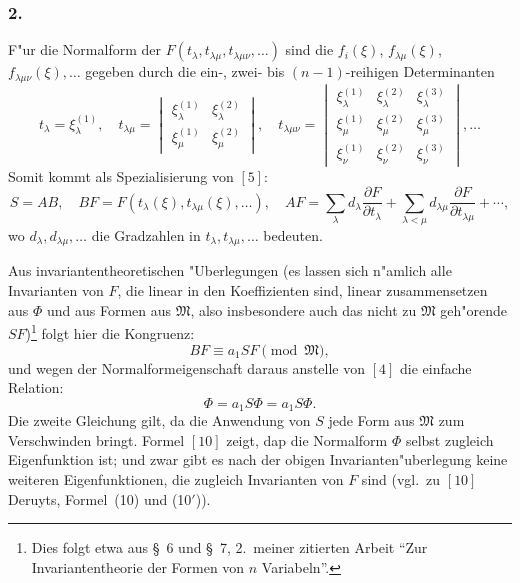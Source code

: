 \documentclass[12pt,a4paper]{article}
\begin{document}
\subsubsection*{2.}

F"ur die Normalform der $F(t_\lambda, t_{\lambda\mu}, t_{\lambda\mu\nu}, \ldots)$ sind die $f_i(\xi)$, $f_{\lambda\mu}(\xi)$, $f_{\lambda\mu\nu}(\xi),\ldots$ gegeben durch die ein-, zwei- bis $(n-1)$-reihigen Determinanten
\begin{equation}
t_\lambda = \xi_\lambda^{(1)}, \quad t_{\lambda\mu} = \begin{vmatrix} \xi_\lambda^{(1)} & \xi_\lambda^{(2)} \\ \xi_\mu^{(1)} & \xi_\mu^{(2)} \end{vmatrix}, \quad t_{\lambda\mu\nu} = \begin{vmatrix} \xi_\lambda^{(1)} & \xi_\lambda^{(2)} & \xi_\lambda^{(3)} \\ \xi_\mu^{(1)} & \xi_\mu^{(2)} & \xi_\mu^{(3)} \\ \xi_\nu^{(1)} & \xi_\nu^{(2)} & \xi_\nu^{(3)} \end{vmatrix}, \ldots
\end{equation}
Somit kommt als Spezialisierung von $[5]$:
\[
S = AB, \quad BF = F(t_\lambda(\xi), t_{\lambda\mu}(\xi), \ldots), \quad AF = \sum_\lambda d_\lambda \frac{\partial F}{\partial t_\lambda} + \sum_{\lambda<\mu} d_{\lambda\mu} \frac{\partial F}{\partial t_{\lambda\mu}} + \cdots,
\]
wo $d_\lambda, d_{\lambda\mu}, \ldots$ die Gradzahlen in $t_\lambda, t_{\lambda\mu}, \ldots$ bedeuten.

Aus invariantentheoretischen "Uberlegungen (es lassen sich n"amlich alle Invarianten von $F$, die linear in den Koeffizienten sind, linear zusammensetzen aus $\Phi$ und aus Formen aus $\mathfrak{M}$, also insbesondere auch das nicht zu $\mathfrak{M}$ geh"orende $SF$)\footnote{Dies folgt etwa aus \S\ 6 und \S\ 7, 2.\ meiner zitierten Arbeit ``Zur Invariantentheorie der Formen von $n$ Variabeln''.} folgt hier die Kongruenz:
\[
BF \equiv a_1 SF \pmod{\mathfrak{M}},
\]
und wegen der Normalformeigenschaft daraus anstelle von $[4]$ die einfache Relation:
\begin{equation}
\Phi = a_1 S\Phi = a_1 S\Phi.
\end{equation}
Die zweite Gleichung gilt, da die Anwendung von $S$ jede Form aus $\mathfrak{M}$ zum Verschwinden bringt. Formel $[10]$ zeigt, dap die Normalform $\Phi$ selbst zugleich Eigenfunktion ist; und zwar gibt es nach der obigen Invarianten"uberlegung keine weiteren Eigenfunktionen, die zugleich Invarianten von $F$ sind (vgl.\ zu $[10]$ Deruyts, Formel~(10) und (10$'$)).
\end{document}
